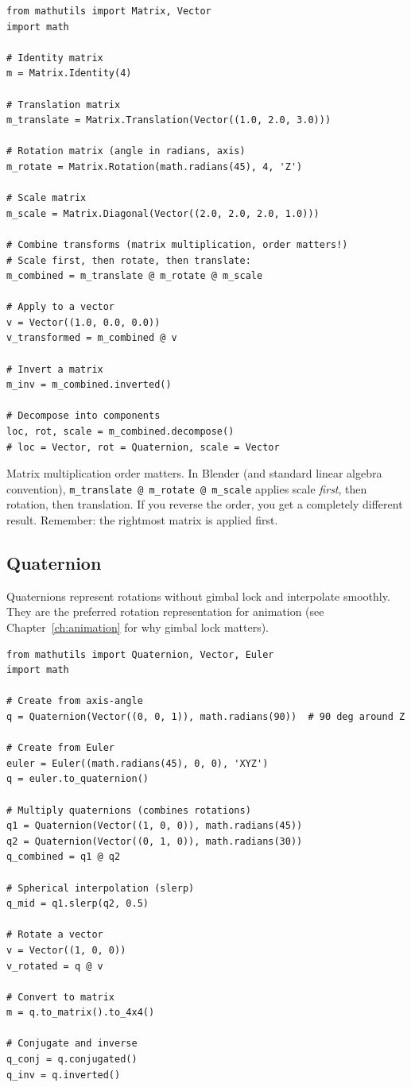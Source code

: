 \begin{lstlisting}
from mathutils import Matrix, Vector
import math

# Identity matrix
m = Matrix.Identity(4)

# Translation matrix
m_translate = Matrix.Translation(Vector((1.0, 2.0, 3.0)))

# Rotation matrix (angle in radians, axis)
m_rotate = Matrix.Rotation(math.radians(45), 4, 'Z')

# Scale matrix
m_scale = Matrix.Diagonal(Vector((2.0, 2.0, 2.0, 1.0)))

# Combine transforms (matrix multiplication, order matters!)
# Scale first, then rotate, then translate:
m_combined = m_translate @ m_rotate @ m_scale

# Apply to a vector
v = Vector((1.0, 0.0, 0.0))
v_transformed = m_combined @ v

# Invert a matrix
m_inv = m_combined.inverted()

# Decompose into components
loc, rot, scale = m_combined.decompose()
# loc = Vector, rot = Quaternion, scale = Vector
\end{lstlisting}

\begin{warningbox}
Matrix multiplication order matters. In Blender (and standard linear algebra convention), \texttt{m\_translate @ m\_rotate @ m\_scale} applies scale \textit{first}, then rotation, then translation. If you reverse the order, you get a completely different result. Remember: the rightmost matrix is applied first.
\end{warningbox}

\subsection{Quaternion}

Quaternions represent rotations without gimbal lock and interpolate smoothly. They are the preferred rotation representation for animation (see Chapter~\ref{ch:animation} for why gimbal lock matters).

\begin{lstlisting}
from mathutils import Quaternion, Vector, Euler
import math

# Create from axis-angle
q = Quaternion(Vector((0, 0, 1)), math.radians(90))  # 90 deg around Z

# Create from Euler
euler = Euler((math.radians(45), 0, 0), 'XYZ')
q = euler.to_quaternion()

# Multiply quaternions (combines rotations)
q1 = Quaternion(Vector((1, 0, 0)), math.radians(45))
q2 = Quaternion(Vector((0, 1, 0)), math.radians(30))
q_combined = q1 @ q2

# Spherical interpolation (slerp)
q_mid = q1.slerp(q2, 0.5)

# Rotate a vector
v = Vector((1, 0, 0))
v_rotated = q @ v

# Convert to matrix
m = q.to_matrix().to_4x4()

# Conjugate and inverse
q_conj = q.conjugated()
q_inv = q.inverted()
\end{lstlisting}

